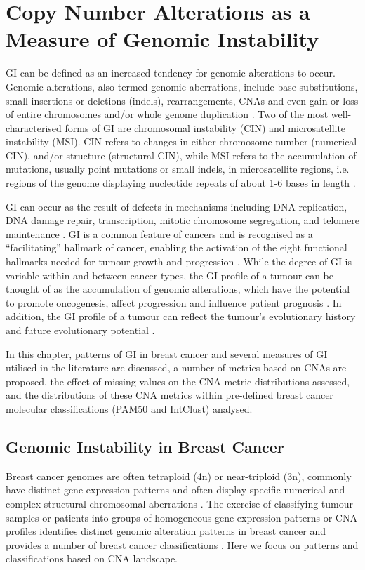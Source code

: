 \section{Copy Number Alterations as a Measure of Genomic Instability}
GI can be defined as an increased tendency for genomic alterations to occur. Genomic alterations, also termed genomic aberrations, include base substitutions, small insertions or deletions (indels), rearrangements, CNAs and even gain or loss of entire chromosomes and/or whole genome duplication \citep{pmid30736983, pmid31078431}. Two of the most well-characterised forms of GI are chromosomal instability (CIN) and microsatellite instability (MSI). CIN refers to changes in either chromosome number (numerical CIN), and/or structure (structural CIN), while MSI refers to the accumulation of mutations, usually point mutations or small indels, in microsatellite regions, i.e. regions of the genome displaying nucleotide repeats of about 1-6 bases in length \citep{pmid30736983, pmid31956294}.  

GI can occur as the result of defects in mechanisms including DNA replication, DNA damage repair, transcription, mitotic chromosome segregation, and telomere maintenance \citep{pmid26907526, pmid30736983, pmid31078431}. GI is a common feature of cancers and is recognised as a “facilitating” hallmark of cancer, enabling the activation of the eight functional hallmarks needed for tumour growth and progression \citep{pmid35022204}. While the degree of GI is variable within and between cancer types, the GI profile of a tumour can be thought of as the accumulation of genomic alterations, which have the potential to promote oncogenesis, affect progression and influence patient prognosis \citep{pmid26907526, pmid30736983}. In addition, the GI profile of a tumour can reflect the tumour's evolutionary history and future evolutionary potential \citep{pmid32242091}.

In this chapter, patterns of GI in breast cancer and several measures of GI utilised in the literature are discussed, a number of metrics based on CNAs are proposed, the effect of missing values on the CNA metric distributions assessed, and the distributions of these CNA metrics within pre-defined breast cancer molecular classifications (PAM50 and IntClust) analysed.

\subsection{Genomic Instability in Breast Cancer}
Breast cancer genomes are often tetraploid (4n) or near-triploid (3n), commonly have distinct gene expression patterns and often display specific numerical and complex structural chromosomal aberrations \citep{pmid31078431}. The exercise of classifying tumour samples or patients into groups of homogeneous gene expression patterns or CNA profiles identifies distinct genomic alteration patterns in breast cancer and provides a number of breast cancer classifications \citep{pmid28733194}. Here we focus on patterns and classifications based on CNA landscape.  

